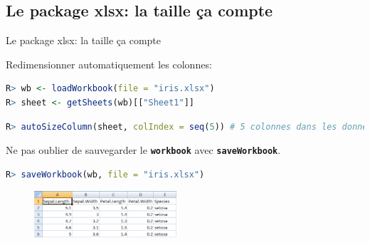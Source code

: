 \documentclass[10pt, xcolors={RGB}, hyperref={pdfpagelabels=false,
        colorlinks=true,
        linkcolor=black,
        urlcolor=black,
        citecolor=black,
        filecolor=black,
        menucolor=black,
        pdftex=true,
        bookmarks=true,
        bookmarksopen=true,
        hyperfootnotes=true}]{beamer}
\newcommand\cmdb[1]{\texttt{\color{dodgerblue}\textbf{#1}}}
\begin{document}
\subsection{Le package xlsx: la taille ça compte}
\begin{frame}[containsverbatim]{Le package xlsx: la taille ça compte}
\par{Redimensionner automatiquement les colonnes:}
\vspace{-2ex}
\begin{lstlisting}[language=R]
R> wb <- loadWorkbook(file = "iris.xlsx")
R> sheet <- getSheets(wb)[["Sheet1"]]
\end{lstlisting}
\vspace{-2ex}
\begin{lstlisting}[language=R]
R> autoSizeColumn(sheet, colIndex = seq(5)) # 5 colonnes dans les donnees iris
\end{lstlisting}
\vspace{2ex}
\par{Ne pas oublier de sauvegarder le \cmdb{workbook} avec \cmdb{saveWorkbook}.}
\vspace{-2ex}
\begin{lstlisting}[language=R]
R> saveWorkbook(wb, file = "iris.xlsx")
\end{lstlisting}
\vspace{1ex}
\begin{center}
    \begin{figure}
        \includegraphics[height=1.7cm, keepaspectratio]{figures/iris_xlsx_2.png}
    \end{figure}
\end{center}
\end{frame}
\end{document}
